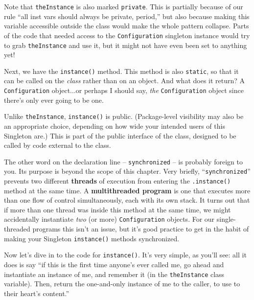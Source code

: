 Note that \texttt{theInstance} is also marked \texttt{private}. This is
partially because of our rule ``all inst vars should always be private,
period,'' but also because making this variable accessible outside the class
would make the whole pattern collapse. Parts of the code that needed access to
the \texttt{Configuration} singleton instance would try to grab
\texttt{theInstance} and use it, but it might not have even been set to
anything yet!

Next, we have the \texttt{instance()} method. This method is also
\texttt{static}, so that it can be called on the \textit{class} rather than on
an object. And what does it return? A \texttt{Configuration} object...or
perhaps I should say, \textit{the} \texttt{Configuration} object since there's
only ever going to be one.


Unlike \texttt{theInstance}, \texttt{instance()} is public. (Package-level
visibility may also be an appropriate choice, depending on how wide your
intended users of this Singleton are.) This is part of the public interface of
the class, designed to be called by code external to the class.


The other word on the declaration line -- \texttt{synchronized} -- is probably
foreign to you. Its purpose is beyond the scope of this chapter. Very briefly,
``\texttt{synchronized}'' prevents two different \textbf{threads} of execution
from entering the \texttt{.instance()} method at the same time. A
\textbf{multithreaded program} is one that executes more than one flow of
control simultaneously, each with its own stack. It turns out that if more than
one thread was inside this method at the same time, we might accidentally
instantiate \textit{two} (or more) \texttt{Configuration} objects. For our
single-threaded programs this isn't an issue, but it's good practice to get in
the habit of making your Singleton \texttt{instance()} methods synchronized.

Now let's dive in to the code for \texttt{instance()}. It's very simple, as
you'll see: all it does is say ``if this is the first time anyone's ever
called me, go ahead and instantiate an instance of me, and remember it (in the
\texttt{theInstance} class variable). Then, return the one-and-only instance
of me to the caller, to use to their heart's content.''

